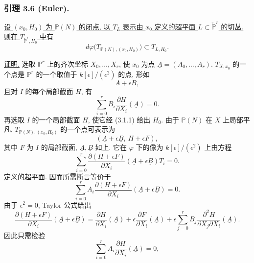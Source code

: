\subsubsection*{引理 3.6 (Euler).}
\underline{设 $(x_0,H_0)$ 为 $\mathbb P(N)$ 的闭点, 以 $T_L$ 表示由 $x_0$ 定义的超平面 $L\subset\check{\mathbb P}^{r}$ 的切丛. 则在 $T_{\check{\mathbb P}^{r},H_0}$ 中有}
\[
d\varphi\bigl(T_{\mathbb P(N),(x_0,H_0)}\bigr)
\subset T_{L,H_0}.
\]

\noindent\underline{证明.}
选取 $\mathbb P^r$ 上的齐次坐标 $X_0,\ldots,X_r$, 使 $x_0$ 为点 $\underline A=(A_0,\ldots,A_r)$. $T_{X,x_0}$ 的一个点是 $\mathbb P^r$ 的一个取值于 $k[\epsilon]/(\epsilon^2)$ 的点, 形如
\begin{equation}\tag{3.6.1}
\underline A+\epsilon\underline B,
\end{equation}
且对 $I$ 的每个局部截面 $H$, 有
\begin{equation}\tag{3.6.2}
\sum_{i=0}^{r}B_i\frac{\partial H}{\partial X_i}(\underline A)=0.
\end{equation}
再选取 $I$ 的一个局部截面 $H$, 使它经 (3.1.1) 给出 $H_0$. 由于 $\mathbb P(N)$ 在 $X$ 上局部平凡, $T_{\mathbb P(N),(x_0,H_0)}$ 的一个点可表示为
\begin{equation}\tag{3.6.3}
(\underline A+\epsilon\underline B,\ H+\epsilon F),
\end{equation}
其中 $F$ 为 $I$ 的局部截面, $\underline A,\underline B$ 如上. 它在 $\varphi$ 下的像为 $k[\epsilon]/(\epsilon^2)$ 上由方程
\begin{equation}\tag{3.6.4}
\sum_{i=0}^{r}
\frac{\partial(H+\epsilon F)}{\partial X_i}
(\underline A+\epsilon\underline B)T_i=0.
\end{equation}
定义的超平面. 因而所需断言等价于
\begin{equation}\tag{3.6.5}
\sum_{i=0}^{r}A_i
\frac{\partial(H+\epsilon F)}{\partial X_i}
(\underline A+\epsilon\underline B)=0.
\end{equation}
由于 $\epsilon^2=0$, Taylor 公式给出
\begin{equation}\tag{3.6.6}
\frac{\partial(H+\epsilon F)}{\partial X_i}
(\underline A+\epsilon\underline B)
=\frac{\partial H}{\partial X_i}(\underline A)
+\epsilon\frac{\partial F}{\partial X_i}(\underline A)
+\epsilon\sum_{j=0}^{r}B_j
\frac{\partial^2H}{\partial X_j\partial X_i}(\underline A).
\end{equation}
因此只需检验
\begin{equation}\tag{3.6.7}
\sum_{i=0}^{r}A_i\frac{\partial H}{\partial X_i}(\underline A)=0,
\end{equation}
